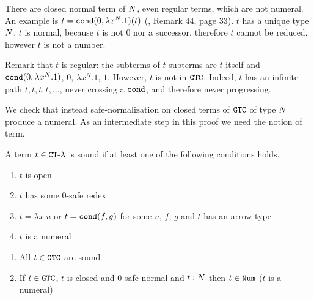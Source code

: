 There are closed normal term of ${N}$, even regular terms, which are not numeral.
An example is $t = {\tt cond}(0, \lambda x^N.1)(t)$ (\cite{2021-Anupam-Das}, Remark 44, page 33). 
$t$ has a unique type ${N}$. $t$ is normal,
because $t$ is not $0$ nor a successor, therefore $t$ cannot be reduced, however $t$ is not a number.

Remark that $t$ is regular: the subterms of $t$
subterms are $t$ itself and${\tt cond}(0, \lambda x^N.1)$, $0$, $\lambda x^N.1$, $1$.
However, $t$ is not in ${\tt GTC}$. Indeed, $t$ has an infinite path $t,t,t,t,\ldots$, never crossing a ${\tt cond}$,
and therefore never progressing.

We check that instead safe-normalization on closed terms of ${\tt GTC}$ of type ${N}$ produce a numeral. 
As an intermediate step in this proof we need the notion of  term.

\begin{definition}
A term $t \in { {\tt CT} \mbox{-} \lambda}$ is sound if at least one of the following conditions holds.
\begin{enumerate}
\item
$t$ is open
\item
$t$ has some $0$-safe redex
\item
$t=\lambda x.u$ or $t = {\tt cond}(f,g)$ for some $u$, $f$, $g$ and $t$ has an arrow type
\item
$t$ is a numeral
\end{enumerate}
\end{definition}

\begin{proposition}
\begin{enumerate}
\item
All $t \in {\tt GTC}$ are sound
\item
If $t \in {\tt GTC}$, $t$ is closed and $0$-safe-normal and $t:{N}$ then $t \in {\tt Num}$ ($t$ is a numeral)
\end{enumerate}
\end{proposition}

